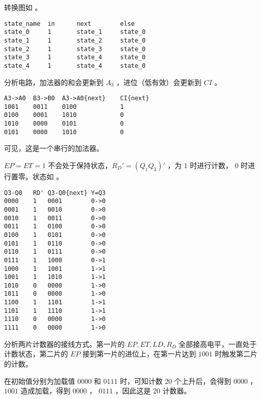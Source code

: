 \documentclass[lang=cn,11pt,a4paper,cite=authoryear]{elegantpaper}
\begin{document}


转换图如  。

\begin{lstlisting}
state_name  in      next        else
state_0     1       state_1     state_0
state_1     1       state_2     state_0
state_2     1       state_3     state_0
state_3     1       state_4     state_0 
state_4     1       state_4     state_0
\end{lstlisting}



分析电路，加法器的和会更新到 \(A_3\) ，进位（低有效）会更新到 \(CI\) 。

\begin{lstlisting}
A3->A0  B3->B0  A3->A0{next}    CI{next}
1001    0011    0100            1
0100    0001    1010            0
1010    0000    0101            0
0101    0000    1010            0
\end{lstlisting}

可见，这是一个串行的加法器。


\(EP = ET = 1\) 不会处于保持状态，\(R_D' = (Q_1Q_3)'\) ，为 \(1\) 时进行计数， \(0\) 时进行置零。状态如  。

\begin{lstlisting}
Q3-Q0   RD' Q3-Q0{next} Y=Q3 
0000    1   0001        0->0
0001    1   0010        0->0
0010    1   0011        0->0
0011    1   0100        0->0
0100    1   0101        0->0
0101    1   0110        0->0
0110    1   0111        0->0
0111    1   1000        0->1
1000    1   1001        1->1
1001    1   1010        1->1
1010    0   0000        1->0
1011    0   0000        1->0
1100    1   1101        1->1
1101    1   1110        1->1
1110    0   0000        1->0
1111    0   0000        1->0
\end{lstlisting}



分析两片计数器的接线方式。第一片的 \(EP, ET, LD, R_D\) 全部接高电平，一直处于计数状态，第二片的 \(EP\) 接到第一片的进位上，在第一片达到 \(1001\)  时触发第二片的计数。

在初始值分别为加载值 \(0000\)  和 \(0111\) 时，可知计数 20 个上升后，会得到 \(0000\) ， \(1001\) 造成加载，得到 \(0000\) ， \(0111\) ，因此这是 20 计数器。
\end{document}
